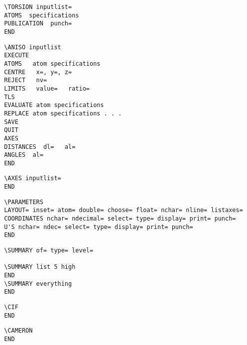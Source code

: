 \documentclass[10pt,a4paper]{report}
\begin{document}
\small\begin{verbatim}
 \TORSION inputlist=
 ATOMS  specifications
 PUBLICATION  punch=
 END
\end{verbatim}\normalsize




\bigskip{}



\small\begin{verbatim}
 \ANISO inputlist
 EXECUTE
 ATOMS   atom specifications
 CENTRE   x=, y=, z=
 REJECT   nv=
 LIMITS   value=   ratio=
 TLS
 EVALUATE atom specifications
 REPLACE atom specifications . . .
 SAVE
 QUIT
 AXES
 DISTANCES  dl=   al=
 ANGLES  al=
 END
\end{verbatim}\normalsize




\bigskip{}



\small\begin{verbatim}
 \AXES inputlist=
 END
\end{verbatim}\normalsize




\bigskip{}



\small\begin{verbatim}
 \PARAMETERS
 LAYOUT= inset= atom= double= choose= float= nchar= nline= listaxes=
 COORDINATES nchar= ndecimal= select= type= display= print= punch=
 U'S nchar= ndec= select= type= display= print= punch=
 END
\end{verbatim}\normalsize




\bigskip{}



\small\begin{verbatim}
 \SUMMARY of= type= level=

 \SUMMARY list 5 high
 END
 \SUMMARY everything
 END
\end{verbatim}\normalsize




\bigskip{}



\small\begin{verbatim}
 \CIF
 END
\end{verbatim}\normalsize




\bigskip{}



\small\begin{verbatim}
 \CAMERON
 END
\end{verbatim}\normalsize


\printindex
\end{document}
